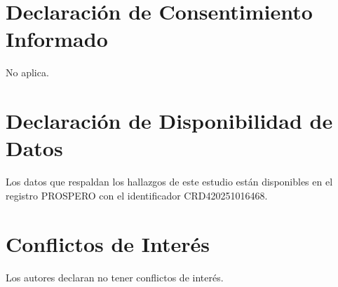 \documentclass{ieeeaccess}
\begin{document}
	\section*{Declaración de Consentimiento Informado}
	No aplica.
	
	\section*{Declaración de Disponibilidad de Datos}
	Los datos que respaldan los hallazgos de este estudio están disponibles en el registro PROSPERO con el identificador CRD420251016468.
	
	\section*{Conflictos de Interés}
	Los autores declaran no tener conflictos de interés.
	
\end{document}
